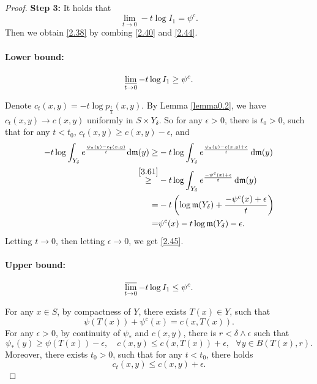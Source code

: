 \documentclass[a4paper,11pt]{article}
\numberwithin{equation}{section}
\theoremstyle{plain}
\theoremstyle{definition}
\theoremstyle{remark}
\newcommand{\mm}{\mathfrak m}
\renewcommand{\d}{{\mathrm d}}
\newcommand{\limi}{\varliminf}
\newcommand{\lims}{\varlimsup}
\begin{document}
\begin{proof}
	\medskip
	
	{\bf Step 3:} It holds that
	\begin{equation}\label{2.44}
		\lim_{t\rightarrow0} -t\log I_1=\psi^c.
	\end{equation}
Then we obtain \eqref{2.38} by combing \eqref{2.40}  and \eqref{2.44}.
     
		
	\paragraph{Lower bound:}
		\begin{equation}\label{2.45}
		\limi_{t\rightarrow0}	-t\log I_1\geq \psi^c.
	\end{equation}

		
		 Denote   $c_t(x,y)=-t \log p_\frac{t}{2}(x,y)$.   By Lemma \ref{lemma0.2},  we have $c_t(x,y)\rightarrow c(x,y)$ uniformly in $S\times Y_\delta$.    So for any $\epsilon>0$, there is $t_0>0$, such that for any $t<t_0$, 
		$c_t(x,y)\geq c(x,y)-\epsilon$, 
		and
		\begin{equation}\label{2.46}
			\begin{aligned}
				-t\log\int_{Y_\delta} e^{\frac{\psi_*(y)-c_t(x,y)}{t}}\d\mm(y)
				\geq &-t\log\int_{Y_\delta} e^{\frac{\psi_*(y)-c(x,y)+\epsilon}{t}}\,\d\mm(y)\\
				\overset{\eqref{3.61}}{\geq} &-t \log\int_{Y_\delta} e^{\frac{-\psi^c(x)+\epsilon}{t}}\,\d\mm(y)\\
				= & -t\left (\log\mm(Y_\delta)+\frac{-\psi^c(x)+\epsilon}{t}\right)\\
				=&\psi^c(x)-t\log\mm(Y_\delta)-\epsilon.
			\end{aligned}
		\end{equation}
		 Letting $t\rightarrow0$,  then letting $\epsilon\rightarrow0$, we get \eqref{2.45}.
		
		
		\paragraph{Upper bound:}
			\begin{equation}\label{2.47}
		\lims_{t\rightarrow0}	-t\log I_1\leq \psi^c.
	\end{equation}


		
		For  any $x\in S$,  by compactness of $Y$,  there exists  $T(x)\in Y$, such that
		$$\psi(T(x))+\psi^c(x)=c(x,T(x)).$$
		For any $\epsilon>0$, by continuity of $\psi_{*}$ and $c(x, y)$,  there is $r<\delta \wedge \epsilon$ such that
		$$\psi_{*}(y)\geq \psi(T(x))-\epsilon,\quad c(x,y)\leq c(x,T(x))+\epsilon,~~~\forall y\in B(T(x), r).$$
		Moreover, there exists $t_0>0$,  such that for any $t<t_0$, there holds
		$$c_t(x,y)\leq c(x,y)+\epsilon.$$
		

\end{proof}
\end{document}
